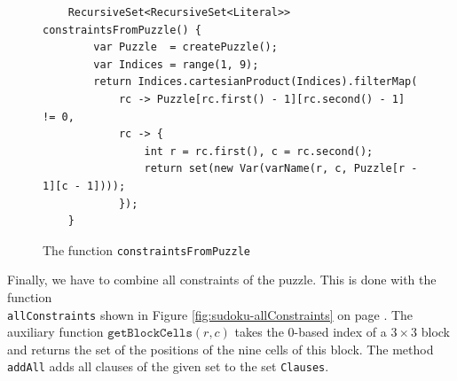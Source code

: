 \begin{figure}[!ht]
\centering
\begin{verbatim}
    RecursiveSet<RecursiveSet<Literal>> constraintsFromPuzzle() {
        var Puzzle  = createPuzzle();
        var Indices = range(1, 9);
        return Indices.cartesianProduct(Indices).filterMap(
            rc -> Puzzle[rc.first() - 1][rc.second() - 1] != 0,
            rc -> {
                int r = rc.first(), c = rc.second();
                return set(new Var(varName(r, c, Puzzle[r - 1][c - 1])));
            });
    }
\end{verbatim}
\vspace*{-0.3cm}
\caption{The function \texttt{constraintsFromPuzzle}}
\label{fig:sudoku-constraintsFromPuzzle}
\end{figure}

Finally, we have to combine all constraints of the puzzle.  This is done with the function \\
\texttt{allConstraints} shown in Figure \ref{fig:sudoku-allConstraints} on page \pageref{fig:sudoku-allConstraints}.
The auxiliary function $\texttt{getBlockCells}(r, c)$ takes the 0-based index of a $3 \times 3$ block and
returns the set of the positions of the nine cells of this block.  The method \texttt{addAll} adds all clauses
of the given set to the set \texttt{Clauses}.

